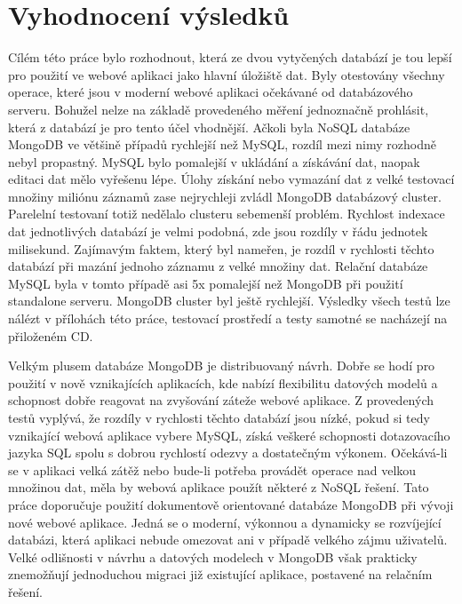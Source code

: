 \chapter{Vyhodnocení výsledků}
Cílém této práce bylo rozhodnout, která ze dvou vytyčených databází je tou lepší pro použití ve webové aplikaci jako hlavní úložiště dat. Byly otestovány všechny operace, které jsou v moderní webové aplikaci očekávané od databázového serveru. Bohužel nelze na základě provedeného měření jednoznačně prohlásit, která z databází je pro tento účel vhodnější. Ačkoli byla NoSQL databáze MongoDB ve většině případů rychlejší než MySQL, rozdíl mezi nimy rozhodně nebyl propastný. MySQL bylo pomalejší v ukládání a získávání dat, naopak editaci dat mělo vyřešenu lépe. Úlohy získání nebo vymazání dat z velké testovací množiny miliónu záznamů zase nejrychleji zvládl MongoDB databázový cluster. Parelelní testovaní totiž nedělalo clusteru sebemenší problém. Rychlost indexace dat jednotlivých databází je velmi podobná, zde jsou rozdíly v řádu jednotek milisekund. Zajímavým faktem, který byl nameřen, je rozdíl v rychlosti těchto databází při mazání jednoho záznamu z velké množiny dat.
Relační databáze MySQL byla v tomto případě asi 5x pomalejší než MongoDB při použití standalone serveru. MongoDB cluster byl ještě rychlejší. Výsledky všech testů lze nálézt v přílohách této práce, testovací prostředí a testy samotné se nacházejí na přiloženém CD.

Velkým plusem databáze MongoDB je distribuovaný návrh. Dobře se hodí pro použití v nově vznikajících aplikacích, kde nabízí flexibilitu datových modelů a schopnost dobře reagovat na zvyšování záteže webové aplikace. Z provedených testů vyplývá, že rozdíly v rychlosti těchto databází jsou nízké, pokud si tedy vznikající webová aplikace vybere MySQL, získá veškeré schopnosti dotazovacího jazyka SQL spolu s dobrou rychlostí odezvy a dostatečným výkonem. Očekává-li se v aplikaci  velká zátěž nebo bude-li potřeba provádět operace nad velkou množinou dat, měla by webová aplikace použít některé z NoSQL řešení. Tato práce doporučuje použití dokumentově orientované databáze MongoDB při vývoji nové webové aplikace. Jedná se o moderní, výkonnou a dynamicky se rozvíjející databázi, která aplikaci nebude omezovat ani v případě velkého zájmu uživatelů. Velké odlišnosti v návrhu a datových modelech v  MongoDB však prakticky znemožňují jednoduchou migraci již existující aplikace, postavené na relačním řešení.
